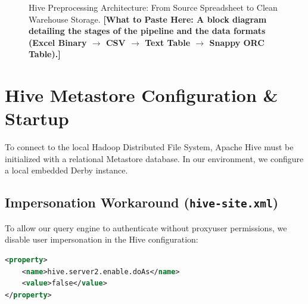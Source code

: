 \documentclass[11pt,a4paper]{article}
\begin{document}
\begin{figure}[H]
\centering
{}
\caption{Hive Preprocessing Architecture: From Source Spreadsheet to Clean Warehouse Storage. \textbf{[What to Paste Here: A block diagram detailing the stages of the pipeline and the data formats (Excel Binary $\rightarrow$ CSV $\rightarrow$ Text Table $\rightarrow$ Snappy ORC Table).]}}
\label{fig:workflow}
\end{figure}

\newpage
\section{Hive Metastore Configuration \& Startup}
To connect to the local Hadoop Distributed File System, Apache Hive must be initialized with a relational Metastore database. In our environment, we configure a local embedded Derby instance.

\subsection{Impersonation Workaround (\texttt{hive-site.xml})}
To allow our query engine to authenticate without proxyuser permissions, we disable user impersonation in the Hive configuration:
\begin{lstlisting}[language=XML]
<property>
    <name>hive.server2.enable.doAs</name>
    <value>false</value>
</property>
\end{lstlisting}
\end{document}
